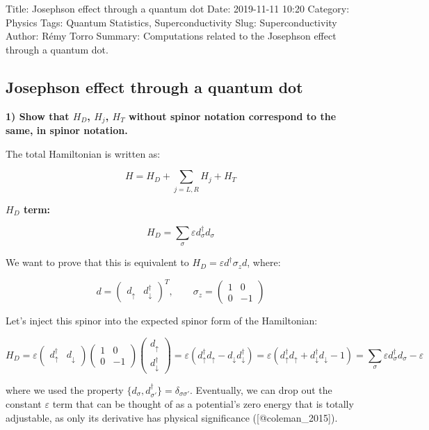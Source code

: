 Title: Josephson effect through a quantum dot Date: 2019-11-11 10:20
Category: Physics Tags: Quantum Statistics, Superconductivity Slug:
Superconductivity Author: Rémy Torro Summary: Computations related to
the Josephson effect through a quantum dot.

\subsection{Josephson effect through a quantum
dot}\label{josephson-effect-through-a-quantum-dot}

\textbf{1) Show that \(H_D\), \(H_j\), \(H_T\) without spinor notation
correspond to the same, in spinor notation.}

The total Hamiltonian is written as:

\[ H = H_D + \sum_{j = L, R} H_j + H_T\]

\textbf{\(H_D\) term:}

\[ H_D = \sum_\sigma \varepsilon d^\dagger_\sigma d_\sigma \]

We want to prove that this is equivalent to
\(H_D = \varepsilon d^\dagger \sigma_z d\), where:

\[ d = \begin{pmatrix}d_{\uparrow} & d_{\downarrow}^\dagger \end{pmatrix}^T, \qquad \sigma_z = \begin{pmatrix}1 & 0 \\
0 & -1 \end{pmatrix} \]

Let's inject this spinor into the expected spinor form of the
Hamiltonian:

\[ H_D = \varepsilon \begin{pmatrix}d_{\uparrow}^\dagger & d_{\downarrow}\end{pmatrix} \begin{pmatrix}1 & 0\\ 0 & -1\end{pmatrix}\begin{pmatrix}d_{\uparrow} \\ d_{\downarrow}^\dagger \end{pmatrix} = \varepsilon (d_{\uparrow}^\dagger d_{\uparrow} - d_{\downarrow}d_{\downarrow}^\dagger) = \varepsilon (d_{\uparrow}^\dagger d_{\uparrow} + d_{\downarrow}^\dagger d_{\downarrow} -1) = \sum_\sigma \varepsilon d^\dagger_\sigma d_\sigma - \varepsilon\]

where we used the property
\(\{d_\sigma, d^\dagger_{\sigma'}\} = \delta_{\sigma \sigma'}\).
Eventually, we can drop out the constant \(\varepsilon\) term that can
be thought of as a potential's zero energy that is totally adjustable,
as only its derivative has physical significance ({[}@coleman\_2015{]}).

